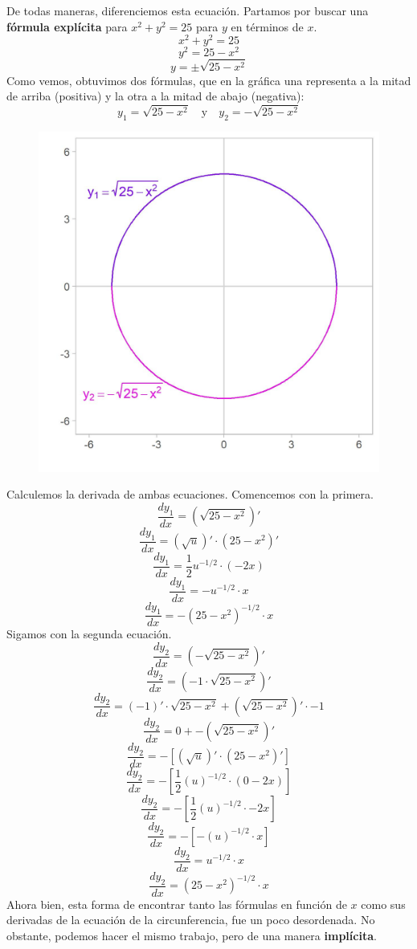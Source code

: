 \documentclass[12pt]{article}
\begin{document}
De todas maneras, diferenciemos esta ecuación. Partamos por buscar una \textbf{fórmula explícita} para $x^{2}+y^{2} = 25$ para $y$ en términos de $x$.
\[x^{2}+y^{2} = 25\]
\[y^{2} = 25 - x^{2}\]
\[y = \pm \sqrt{25 - x^{2}}\]
Como vemos, obtuvimos dos fórmulas, que en la gráfica una representa a la mitad de arriba (positiva) y la otra a la mitad de abajo (negativa):
\[y_{1} = \sqrt{25 - x^{2}} \quad \mathrm{y} \quad y_{2} = -\sqrt{25 - x^{2}}\]

\newpage

\begin{figure}[hbt!]
\centering
\includegraphics[scale=0.7]{img/implicit_diff_2.jpg}
\end{figure}

Calculemos la derivada de ambas ecuaciones. Comencemos con la primera.
\[\frac{dy_{1}}{dx} = (\sqrt{25 - x^{2}})'\]
\[\frac{dy_{1}}{dx} = (\sqrt{u})' \cdot (25 - x^{2})'\]
\[\frac{dy_{1}}{dx} = \frac{1}{2}u^{-1/2} \cdot (-2x)\]
\[\frac{dy_{1}}{dx} = -u^{-1/2} \cdot x\]
\[\frac{dy_{1}}{dx} = -(25 - x^{2})^{-1/2} \cdot x\]
Sigamos con la segunda ecuación.
\[\frac{dy_{2}}{dx} = (-\sqrt{25 - x^{2}})'\]
\[\frac{dy_{2}}{dx} = (-1 \cdot \sqrt{25 - x^{2}})'\]
\[\frac{dy_{2}}{dx} = (-1)' \cdot \sqrt{25 - x^{2}} + (\sqrt{25 - x^{2}})' \cdot -1\]
\[\frac{dy_{2}}{dx} = 0 + -(\sqrt{25 - x^{2}})'\]
\[\frac{dy_{2}}{dx} = -[(\sqrt{u})' \cdot (25 - x^{2})']\]
\[\frac{dy_{2}}{dx} = -\left[\frac{1}{2} (u)^{-1/2} \cdot (0 - 2x)\right]\]
\[\frac{dy_{2}}{dx} = -\left[\frac{1}{2} (u)^{-1/2} \cdot -2x\right]\]
\[\frac{dy_{2}}{dx} = -[-(u)^{-1/2} \cdot x]\]
\[\frac{dy_{2}}{dx} = u^{-1/2} \cdot x\]
\[\frac{dy_{2}}{dx} = (25 - x^{2})^{-1/2} \cdot x\]
Ahora bien, esta forma de encontrar tanto las fórmulas en función de $x$ como sus derivadas de la ecuación de la circunferencia, fue un poco desordenada. No obstante, podemos hacer el mismo trabajo, pero de una manera \textbf{implícita}.
\end{document}
